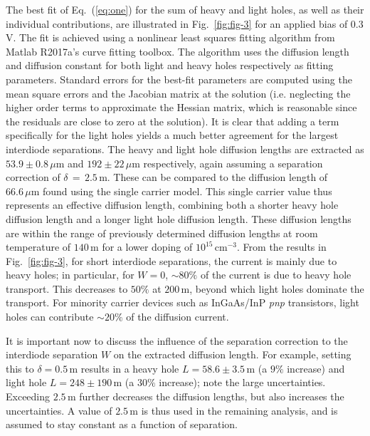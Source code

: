 \documentclass[aip,amsmath,amssymb,reprint]{revtex4-1}
\begin{document}
The best fit of Eq.~(\ref{eq:one}) for the sum of heavy and light holes, as well as their individual contributions, are illustrated in Fig.~\ref{fig:fig-3} for an applied bias of 0.3 V.
 The fit is achieved using a nonlinear least squares fitting algorithm from Matlab R2017a's curve fitting toolbox.
 The algorithm uses the diffusion length and diffusion constant for both light and heavy holes respectively as fitting parameters.
 Standard errors for the best-fit parameters are computed using the mean square errors and the Jacobian matrix at the solution (i.e. neglecting the higher order terms to approximate the Hessian matrix, which is reasonable since the residuals are close to zero at the solution).
 It is clear that adding a term specifically for the light holes yields a much better agreement for the largest interdiode separations.
 The heavy and light hole diffusion lengths are extracted as $53.9\pm0.8\,\mu \text{m}$ and $192\pm22\,\mu\text{m}$ respectively, again assuming a separation correction of $\delta\,=\,2.5\,$\textmu m.
 These can be compared to the diffusion length of $66.6\,\mu \text{m}$ found using the single carrier model.
 This single carrier value thus represents an effective diffusion length, combining both a shorter heavy hole diffusion length and a longer light hole diffusion length.
 These diffusion lengths are within the range of previously determined diffusion lengths at room temperature of $140\,$\textmu m for a lower doping of $10^{15}\, \text{cm}^{-3}$.\cite{Gallant}
 From the results in Fig.~\ref{fig:fig-3}, for short interdiode separations, the current is mainly due to heavy holes; in particular, for $W=0$, ${\sim}80\%$ of the current is due to heavy hole transport.
 This decreases to $50\%$ at $200\,$\textmu m, beyond which light holes dominate the transport.
 For minority carrier devices such as InGaAs/InP \textit{pnp} transistors, light holes can contribute ${\sim}20\%$ of the diffusion current.

It is important now to discuss the influence of the separation correction to the interdiode separation $W$ on the extracted diffusion length. For example, setting this to $\delta=0.5\,$\textmu m results in a heavy hole $L=58.6\pm3.5\,$\textmu m (a $9\%$ increase) and light hole $L=248\pm190\,$\textmu m (a $30\%$ increase); note the large uncertainties. Exceeding $2.5\,$\textmu m further decreases the diffusion lengths, but also increases the uncertainties. A value of $2.5\,$\textmu m is thus used in the remaining analysis, and is assumed to stay constant as a function of separation. 
\end{document}
